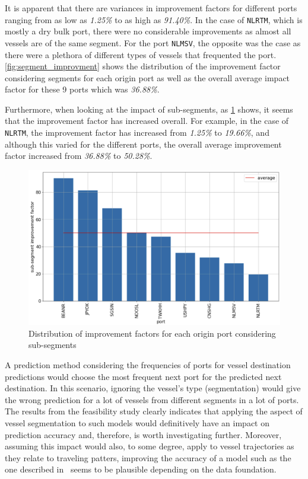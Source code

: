 It is apparent that there are variances in improvement factors for different ports ranging from as low as \textit{1.25\%} to as high as \textit{91.40\%}. In the case of \texttt{NLRTM}, which is mostly a dry bulk port, there were no considerable improvements as almost all vessels are of the same segment. For the port \texttt{NLMSV}, the opposite was the case as there were a plethora of different types of vessels that frequented the port. \cref{fig:segment_improvment} shows the distribution of the improvement factor considering segments for each origin port as well as the overall average impact factor for these 9 ports which was \textit{36.88\%}.

Furthermore, when looking at the impact of sub-segments, as \cref{fig:subsegment_improvment} shows, it seems that the improvement factor has increased overall. For example, in the case of \texttt{NLRTM}, the improvement factor has increased from \textit{1.25\%} to \textit{19.66\%}, and although this varied for the different ports, the overall average improvement factor increased from \textit{36.88\%} to \textit{50.28\%}.

\begin{figure}[htbp]
    \centering
    \includegraphics[width=.9\textwidth]{figures/apw/subsegment_improvement.png}
    \caption{Distribution of improvement factors for each origin port considering sub-segments}
    \label{fig:subsegment_improvment}
\end{figure}

A prediction method considering the frequencies of ports for vessel destination predictions would choose the most frequent next port for the predicted next destination. In this scenario, ignoring the vessel's type (segmentation) would give the wrong prediction for a lot of vessels from different segments in a lot of ports. The results from the feasibility study clearly indicates that applying the aspect of vessel segmentation to such models would definitively have an impact on prediction accuracy and, therefore, is worth investigating further. Moreover, assuming this impact would also, to some degree, apply to vessel trajectories as they relate to traveling patters, improving the accuracy of a model such as the one described in~\cite{ZHANG2020102729} seems to be plausible depending on the data foundation.
